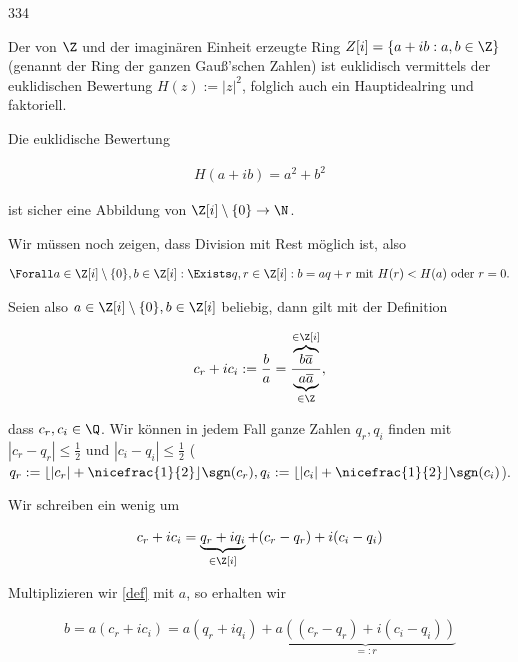 \begin{algebraUE}{334}

Der von $\Z$ und der imaginären Einheit erzeugte Ring $Z[i] = \{a + ib: a,b \in \Z\}$
(genannt der Ring der ganzen Gauß'schen Zahlen) ist euklidisch vermittels der
euklidischen Bewertung $H(z) := |z|^2$, folglich auch ein Hauptidealring und faktoriell.

\end{algebraUE}

\begin{solution}

Die euklidische Bewertung

\begin{align*}
  H(a+ib) = a^2 + b^2
\end{align*}

ist sicher eine Abbildung von $\Z [i] \setminus \{0\} \to \N$.

Wir müssen noch zeigen, dass Division mit Rest möglich ist, also

\begin{align*}
  \Forall a \in \Z [i] \setminus \{0\}, b \in \Z [i]: \Exists q,r \in \Z [i]: b = aq + r \text{~mit~} H(r) < H(a) \text{ oder } r = 0.
\end{align*}

Seien also $a \in \Z [i] \setminus \{0\}, b \in \Z [i]$ beliebig, dann gilt mit der Definition

\begin{align}\label{def}
  c_r + i c_i := \frac{b}{a} = \frac{\overbrace{b\overline{a}}^{\in \Z[i]}}{\underbrace{a\overline{a}}_{\in \Z}},
\end{align}

dass $c_r, c_i \in \Q$. Wir können in jedem Fall ganze Zahlen $q_r, q_i$ finden mit $|c_r-q_r| \leq \frac{1}{2}$ und $|c_i-q_i| \leq \frac{1}{2}$
($q_r := \lfloor |c_r| + \nicefrac{1}{2}\rfloor\sgn(c_r), q_i := \lfloor |c_i| + \nicefrac{1}{2}\rfloor\sgn(c_i)$).

Wir schreiben ein wenig um

\begin{align*}
  c_r + i c_i = \underbrace{q_r + i q_i}_{\in \Z [i]} + (c_r- q_r) + i (c_i - q_i)
\end{align*}

Multiplizieren wir \eqref{def} mit $a$, so erhalten wir

\begin{align*}
  b = a(c_r + ic_i) = a(q_r + i q_i) + \underbrace{a((c_r- q_r) + i (c_i - q_i))}_{=: r}
\end{align*}


\end{solution}
